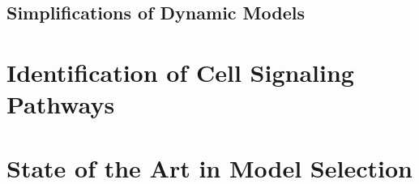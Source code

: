 \subsection{Simplifications of Dynamic Models}

\section{Identification of Cell Signaling Pathways}
\section{State of the Art in Model Selection}
